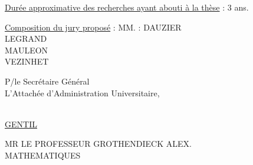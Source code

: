 \uline{Durée approximative des recherches ayant abouti à la thèse} : 3 ans.

\uline{Composition du jury proposé} : MM. : DAUZIER\\
LEGRAND\\
MAULEON\\
VEZINHET

P/le Secrétaire Général\\
L'Attachée d'Administration Universitaire,

\uline{}\\
\uline{GENTIL}

MR LE PROFESSEUR GROTHENDIECK ALEX.\\
MATHEMATIQUES

